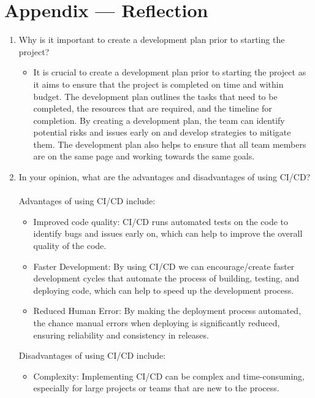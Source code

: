\documentclass{article}
\begin{document}
\newpage{}

\section*{Appendix --- Reflection}

\begin{enumerate}
    \item Why is it important to create a development plan prior to starting the
    project?
    \begin{itemize}
        \item It is crucial to create a development plan prior to starting the project as it aims to ensure that the project is completed on time and within budget. The development plan outlines the tasks that need to be completed, the resources that are required, and the timeline for completion. By creating a development plan, the team can identify potential risks and issues early on and develop strategies to mitigate them. The development plan also helps to ensure that all team members are on the same page and working towards the same goals.
    \end{itemize}
    \item In your opinion, what are the advantages and disadvantages of using
    CI/CD? \\ \\
        Advantages of using CI/CD include:
        \begin{itemize}
        \item Improved code quality: CI/CD runs automated tests on the code to identify bugs and issues early on, which can help to improve the overall quality of the code.
        \item Faster Development: By using CI/CD we can encourage/create faster development cycles that automate the process of building, testing, and deploying code, which can help to speed up the development process.
        \item Reduced Human Error: By making the deployment process automated, the chance manual errors when deploying is significantly reduced, ensuring reliability and consistency in releases.
        \end{itemize}
        Disadvantages of using CI/CD include:
        \begin{itemize}
        \item Complexity: Implementing CI/CD can be complex and time-consuming, especially for large projects or teams that are new to the process.

\end{itemize}
\end{enumerate}
\end{document}
